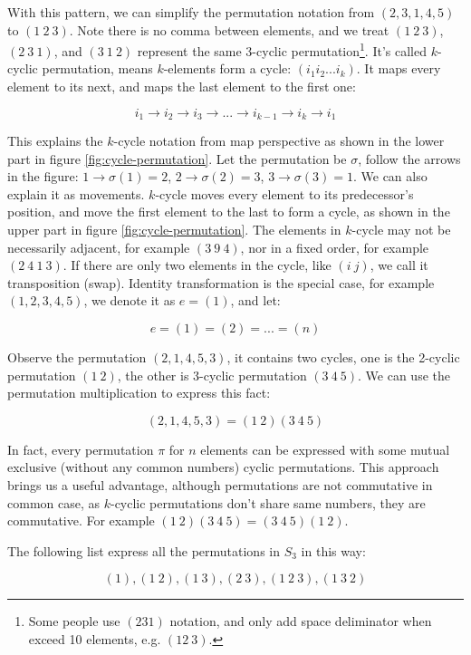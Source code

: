 \documentclass[b5paper]{article}
\begin{document}
With this pattern, we can simplify the permutation notation from $(2, 3, 1, 4, 5)$ to $(1\ 2\ 3)$. Note there is no comma between elements, and we treat $(1\ 2\ 3)$, $(2\ 3\ 1)$, and $(3\ 1\ 2)$ represent the same 3-cyclic permutation\footnote{Some people use $(231)$ notation, and only add space deliminator when exceed 10 elements, e.g. $(12\ 3)$.}. It's called $k$-cyclic permutation, means $k$-elements form a cycle: $(i_1 i_2 ... i_k)$. It maps every element to its next, and maps the last element to the first one:

\[
i_1 \to i_2 \to i_3 \to ... \to i_{k-1} \to i_k \to i_1
\]

This explains the $k$-cycle notation from map perspective as shown in the lower part in figure \ref{fig:cycle-permutation}. Let the permutation be $\sigma$, follow the arrows in the figure: $1 \to \sigma(1) = 2$, $2 \to \sigma(2) = 3$, $3 \to \sigma(3) = 1$. We can also explain it as movements. $k$-cycle moves every element to its predecessor's position, and move the first element to the last to form a cycle, as shown in the upper part in figure \ref{fig:cycle-permutation}. The elements in $k$-cycle may not be necessarily adjacent, for example $(3\ 9\ 4)$, nor in a fixed order, for example $(2\ 4\ 1\ 3)$. If there are only two elements in the cycle, like $(i\ j)$, we call it transposition (swap). Identity transformation is the special case, for example $(1, 2, 3, 4, 5)$, we denote it as $e = (1)$, and let:

\[
e = (1) = (2) = ... = (n)
\]

Observe the permutation $(2, 1, 4, 5, 3)$, it contains two cycles, one is the 2-cyclic permutation $(1\ 2)$, the other is 3-cyclic permutation $(3\ 4\ 5)$. We can use the permutation multiplication to express this fact:

\[
(2, 1, 4, 5, 3) = (1\ 2)(3\ 4\ 5)
\]

In fact, every permutation $\pi$ for $n$ elements can be expressed with some mutual exclusive (without any common numbers) cyclic permutations. This approach brings us a useful advantage, although permutations are not commutative in common case, as $k$-cyclic permutations don't share same numbers, they are commutative. For example $(1\ 2)(3\ 4\ 5) = (3\ 4\ 5)(1\ 2)$.

The following list express all the permutations in $S_3$ in this way:

\[
(1), (1\ 2), (1\ 3), (2\ 3), (1\ 2\ 3), (1\ 3\ 2)
\]
\end{document}
